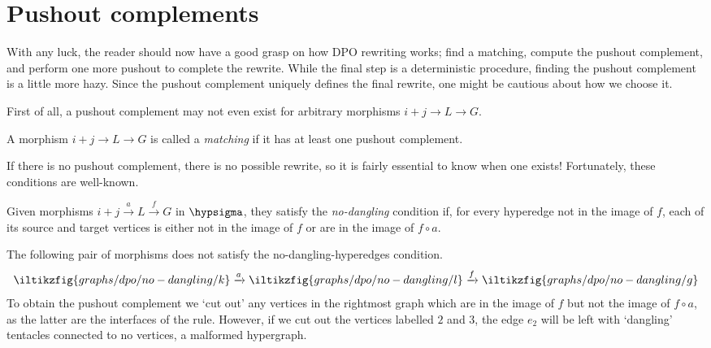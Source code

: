 \section{Pushout complements}

With any luck, the reader should now have a good grasp on how DPO rewriting
works; find a matching, compute the pushout complement, and perform one more
pushout to complete the rewrite.
While the final step is a deterministic procedure, finding the pushout
complement is a little more hazy.
Since the pushout complement uniquely defines the final rewrite, one might be
cautious about how we choose it.

First of all, a pushout complement may not even exist for arbitrary morphisms
\(i+j \to L \to G\).

\begin{definition}
    A morphism \(i+j \to L \to G\) is called a \emph{matching} if it
    has at least one pushout complement.
\end{definition}

If there is no pushout complement, there is no possible rewrite, so it is fairly
essential to know when one exists!
Fortunately, these conditions are well-known.

\begin{definition}
    Given morphisms \(i+j \xrightarrow{a} L \xrightarrow{f} G\) in
    \(\hypsigma\), they satisfy the \emph{no-dangling} condition if, for every
    hyperedge not in
    the image of \(f\), each of its source and target vertices is either not in
    the image of \(f\) or are in the image of \(f \circ a\).
\end{definition}

\begin{example}
    The following pair of morphisms does not satisfy the no-dangling-hyperedges
    condition.
    \[
        \iltikzfig{graphs/dpo/no-dangling/k}
        \xrightarrow{a}
        \iltikzfig{graphs/dpo/no-dangling/l}
        \xrightarrow{f}
        \iltikzfig{graphs/dpo/no-dangling/g}
    \]
    To obtain the pushout complement we `cut out' any vertices in the
    rightmost graph which are in the image of \(f\) but not the image of
    \(f \circ a\), as the latter are the interfaces of the rule.
    However, if we cut out the vertices labelled \(2\) and \(3\), the edge
    \(e_2\) will be left with `dangling' tentacles connected to no vertices, a
    malformed hypergraph.
    \begin{center}
    \end{center}
\end{example}

